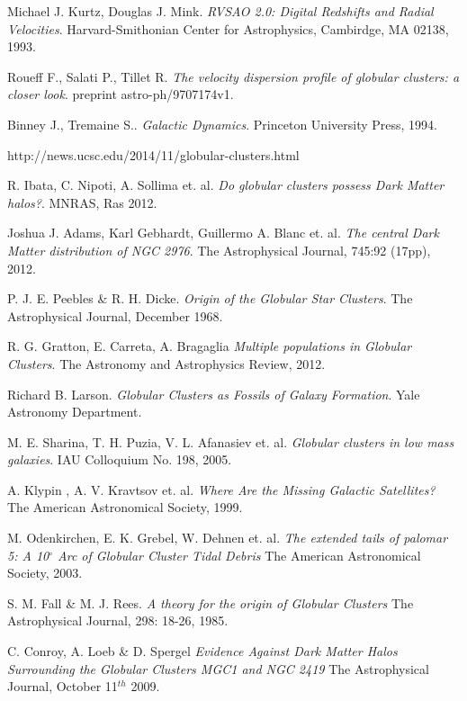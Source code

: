 \documentclass[a4paper, 11pt, oneside]{Thesis}  %
\begin{document}
\begin{thebibliography}{9}


Michael J. Kurtz, Douglas J. Mink. 
\textit{RVSAO 2.0: Digital Redshifts and Radial Velocities}. 
Harvard-Smithonian Center for Astrophysics, Cambirdge, MA 02138, 1993.

Roueff F., Salati P., Tillet R. 
\textit{The velocity dispersion profile of globular clusters: a closer look}. 
preprint astro-ph/9707174v1.

Binney J., Tremaine S.. 
\textit{Galactic Dynamics}. 
Princeton University Press, 1994.

http://news.ucsc.edu/2014/11/globular-clusters.html

R. Ibata, C. Nipoti, A. Sollima et. al. 
\textit{Do globular clusters possess Dark Matter halos?}.
MNRAS, Ras 2012.

Joshua J. Adams, Karl Gebhardt, Guillermo A. Blanc et. al. 
\textit{The central Dark Matter distribution of NGC 2976}.
The Astrophysical Journal, 745:92 (17pp), 2012.

P. J. E. Peebles \& R. H. Dicke. 
\textit{Origin of the Globular Star Clusters}.
The Astrophysical Journal, December 1968.

R. G. Gratton, E. Carreta, A. Bragaglia
\textit{Multiple populations in Globular Clusters}.
The Astronomy and Astrophysics Review, 2012.

Richard B. Larson.
\textit{Globular Clusters as Fossils of Galaxy Formation}.
Yale Astronomy Department.

M. E. Sharina, T. H. Puzia, V. L. Afanasiev et. al.
\textit{Globular clusters in low mass galaxies}.
IAU Colloquium No. 198, 2005.

A. Klypin , A. V. Kravtsov et. al. 
\textit{Where Are the Missing Galactic Satellites?} 
The American Astronomical Society, 1999. 

M. Odenkirchen, E. K. Grebel, W. Dehnen et. al.
\textit{The extended tails of palomar 5: A 10$^{\circ}$ Arc of Globular Cluster Tidal Debris}
The American Astronomical Society, 2003.

S. M. Fall \& M. J. Rees.
\textit{A theory for the origin of Globular Clusters}
The Astrophysical Journal, 298: 18-26, 1985.

C. Conroy, A. Loeb \& D. Spergel
\textit{Evidence Against Dark Matter Halos Surrounding the Globular Clusters MGC1 and NGC 2419}
The Astrophysical Journal, October 11$^{th}$ 2009.


\end{thebibliography}
\end{document}
